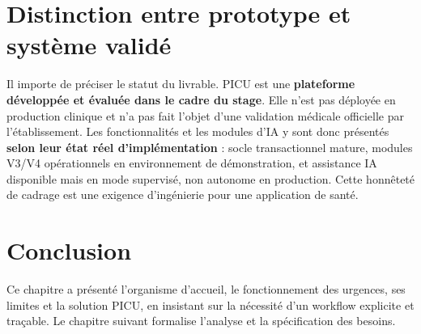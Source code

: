 \section{Distinction entre prototype et système validé}

Il importe de préciser le statut du livrable. PICU est une \textbf{plateforme développée et évaluée dans le cadre du stage}. Elle n'est pas déployée en production clinique et n'a pas fait l'objet d'une validation médicale officielle par l'établissement. Les fonctionnalités et les modules d'IA y sont donc présentés \textbf{selon leur état réel d'implémentation} : socle transactionnel mature, modules V3/V4 opérationnels en environnement de démonstration, et assistance IA disponible mais en mode supervisé, non autonome en production. Cette honnêteté de cadrage est une exigence d'ingénierie pour une application de santé.

\section{Conclusion}

Ce chapitre a présenté l'organisme d'accueil, le fonctionnement des urgences, ses limites et la solution PICU, en insistant sur la nécessité d'un workflow explicite et traçable. Le chapitre suivant formalise l'analyse et la spécification des besoins.
